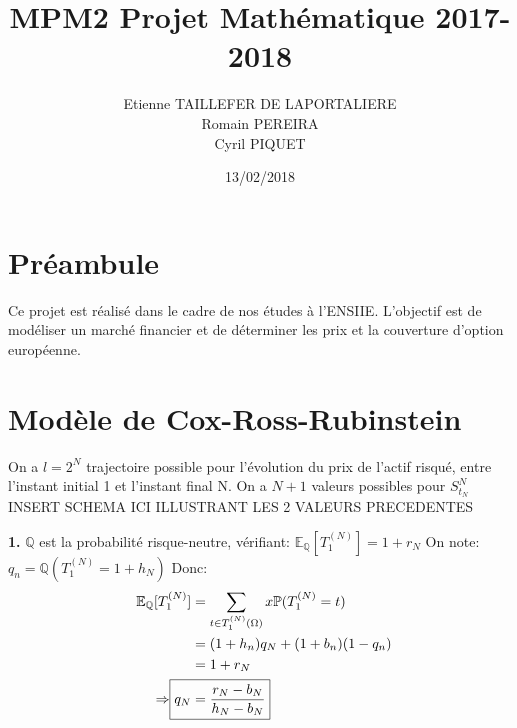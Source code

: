 \documentclass[10pt]{article}
\title{MPM2 Projet Mathématique 2017-2018}
\author{
			Etienne TAILLEFER DE LAPORTALIERE \\
			Romain PEREIRA\\
			Cyril PIQUET
}
\date{13/02/2018}
\begin{document}
	\maketitle
	\tableofcontents

	\section*{Préambule}

		Ce projet est réalisé dans le cadre de nos études à l'ENSIIE.
		L'objectif est de modéliser un marché financier et de déterminer les prix et la couverture d'option européenne.

	\newpage
	\section{Modèle de Cox-Ross-Rubinstein}
		On a \( \boxed{l = 2^N} \) trajectoire possible pour l'évolution du prix de l'actif risqué, entre l'instant initial 1 et l'instant final N.\newline
		On a \( \boxed{N + 1}   \) valeurs possibles pour \( S^{N}_{t_N} \)\newline
		\newline
		INSERT SCHEMA ICI ILLUSTRANT LES 2 VALEURS PRECEDENTES
		\newline
		
		\textbf{1.} \(\mathbb{Q}\) est la probabilité risque-neutre, vérifiant: \( \mathbb{E}_{\mathbb{Q}}[T^{(N)}_{1}] = 1 + r_N \)
		\newline
		On note: \( q_n = \mathbb{Q}(T^{(N)}_1 = 1 + h_N) \)
		Donc:
		\begin{align}
			\begin{split}
				\mathbb{E}_{\mathbb{Q}}[T^{(N)}_1] &= \sum_{t \in T^{(N)}_{1}(\Omega)}x 	\mathbb{P}(T^{(N)}_{1} = t) \\
										\qquad &= (1 + h_n) q_N + (1 + b_n) (1 - q_n) \\
										\qquad &= 1 + r_N \\					
										\qquad \Rightarrow \Aboxed{q_N &= \frac{r_N - b_N}{h_N - b_N}}
			\end{split}
		\end{align}
		
\end{document}
